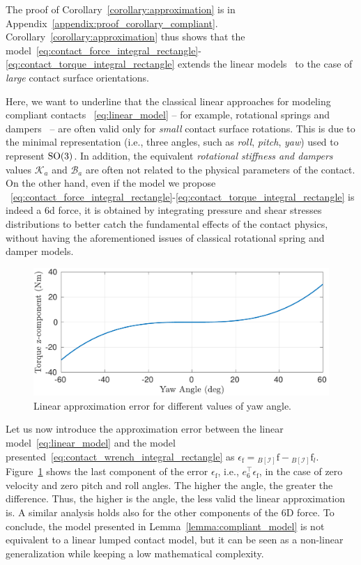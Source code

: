 The proof of Corollary~\ref{corollary:approximation} is in Appendix~\ref{appendix:proof_corollary_compliant}.
Corollary~\ref{corollary:approximation} thus shows that
the model~\eqref{eq:contact_force_integral_rectangle}-\eqref{eq:contact_torque_integral_rectangle} extends the linear models~\citep{Sygulla2020AFootholds:} to the case of \emph{large} contact surface orientations. 
\par
Here, we want to underline that the classical linear approaches for modeling compliant contacts ~\eqref{eq:linear_model} -- for example, rotational springs and dampers \citep{Sygulla2020AFootholds:}~-- are often valid only for \emph{small} contact surface rotations. This is due to the minimal representation (i.e., three angles, such as \emph{roll}, \emph{pitch}, \emph{yaw}) used to represent $\mathrm{SO}(3)$. In addition, the equivalent \emph{rotational stiffness and dampers} values $\mathcal{K}_a$ and $\mathcal{B}_a$ are often not related to the physical parameters of the contact. On the other hand, even if the model we propose ~\eqref{eq:contact_force_integral_rectangle}-\eqref{eq:contact_torque_integral_rectangle} is indeed a 6d force, it is obtained by integrating pressure and shear stresses distributions to better catch the fundamental effects of the contact physics, without having the aforementioned issues of classical rotational spring and damper models.
\par
\begin{figure}[t]
\centering
\includegraphics[width=0.9\columnwidth]{chapter_compliant_contact/figures/comparison_lumped_continuous.pdf}
\caption{Linear approximation error for different values of yaw angle.
\label{fig:approximation_error}}
\end{figure}
Let us now introduce the approximation error between the linear model~\eqref{eq:linear_model} and the model presented~\eqref{eq:contact_wrench_integral_rectangle} as $\epsilon_\mathrm{f} = {}_{B[\mathcal{I}]} \mathrm{f}  - {}_{B[\mathcal{I}]}\mathrm{f}_l$.
Figure~\ref{fig:approximation_error} shows the last component of the error $\epsilon_\mathrm{f}$, i.e., $e_6^\top \epsilon_\mathrm{f}$, in the case of zero velocity and zero pitch and roll angles. The higher the angle, the greater the difference. Thus, the higher is the angle, the less valid the linear approximation is. A similar analysis holds also for the other components of the 6D force. 
To conclude, the model presented in Lemma~\ref{lemma:compliant_model} is not equivalent to a linear lumped contact model, but it can be seen as a non-linear generalization while keeping a low mathematical complexity.



    











